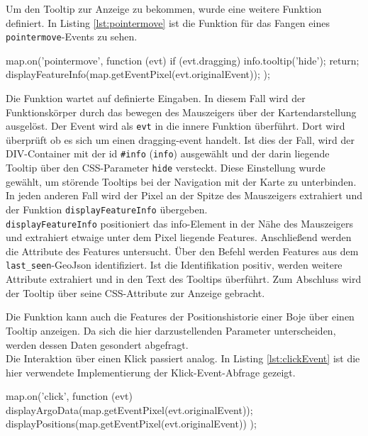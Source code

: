 Um den Tooltip zur Anzeige zu bekommen, wurde eine weitere Funktion definiert. In Listing \ref{lst:pointermove} ist die Funktion für das Fangen eines \texttt{pointermove}-Events zu sehen.
\begin{javascript}[label={lst:pointermove}, caption={Das Abfangen eines pointermove-Events}]
map.on('pointermove', function (evt) {
    if (evt.dragging) {
        info.tooltip('hide');
        return;
    }
    displayFeatureInfo(map.getEventPixel(evt.originalEvent));
});
\end{javascript}

Die Funktion wartet auf definierte Eingaben. In diesem Fall wird der Funktionskörper durch das bewegen des Mauszeigers über der Kartendarstellung ausgelöst. Der Event wird als \texttt{evt} in die innere Funktion überführt. Dort wird überprüft ob es sich um einen dragging-event handelt. Ist dies der Fall, wird der DIV-Container mit der id \texttt{\#info} (\texttt{info}) ausgewählt und der darin liegende Tooltip über den CSS-Parameter \texttt{hide} versteckt. Diese Einstellung wurde gewählt, um störende Tooltips bei der Navigation mit der Karte zu unterbinden. In jeden anderen Fall wird der Pixel an der Spitze des Mauszeigers extrahiert und der Funktion \texttt{displayFeatureInfo} übergeben.
\\
\texttt{displayFeatureInfo} positioniert das info-Element in der Nähe des Mauszeigers und extrahiert etwaige unter dem Pixel liegende Features. Anschließend werden die Attribute des Features untersucht. Über den Befehl  werden Features aus dem \texttt{last\_seen}-GeoJson identifiziert. Ist die Identifikation positiv, werden weitere Attribute extrahiert und in den Text des Tooltips überführt. Zum Abschluss wird der Tooltip über seine CSS-Attribute zur Anzeige gebracht.

Die Funktion kann auch die Features der Positionshistorie einer Boje über einen Tooltip anzeigen. Da sich die hier darzustellenden Parameter unterscheiden, werden dessen Daten gesondert abgefragt. 
\\

Die Interaktion über einen Klick passiert analog. In Listing \ref{lst:clickEvent} ist die hier verwendete Implementierung der Klick-Event-Abfrage gezeigt.
\begin{javascript}[label={lst:clickEvent}, caption={Das Abfangen eines Klick-Events}]
map.on('click', function (evt) {
    displayArgoData(map.getEventPixel(evt.originalEvent));
    displayPositions(map.getEventPixel(evt.originalEvent))
});
\end{javascript}

